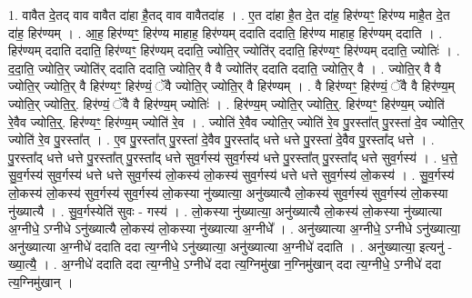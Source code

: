 \documentclass[17pt]{extarticle}
\begin{document}
1. वावैत दे॒तद् वाव वावैत दा॑हा है॒तद् वाव वावैतदा॑ह । . ए॒त दा॑हा है॒त दे॒त दा॑ह॒ हिर॑ण्यꣳ॒॒ हिर॑ण्य माहै॒त दे॒त दा॑ह॒ हिर॑ण्यम् । . आ॒ह॒ हिर॑ण्यꣳ॒॒ हिर॑ण्य माहाह॒ हिर॑ण्यम् ददाति ददाति॒ हिर॑ण्य माहाह॒ हिर॑ण्यम् ददाति । . हिर॑ण्यम् ददाति ददाति॒ हिर॑ण्यꣳ॒॒ हिर॑ण्यम् ददाति॒ ज्योति॒र् ज्योति॑र् ददाति॒ हिर॑ण्यꣳ॒॒ हिर॑ण्यम् ददाति॒ ज्योतिः॑ । . द॒दा॒ति॒ ज्योति॒र् ज्योति॑र् ददाति ददाति॒ ज्योति॒र् वै वै ज्योति॑र् ददाति ददाति॒ ज्योति॒र् वै । . ज्योति॒र् वै वै ज्योति॒र् ज्योति॒र् वै हिर॑ण्यꣳ॒॒ हिर॑ण्यं॒ ॅवै ज्योति॒र् ज्योति॒र् वै हिर॑ण्यम् । . वै हिर॑ण्यꣳ॒॒ हिर॑ण्यं॒ ॅवै वै हिर॑ण्य॒म् ज्योति॒र् ज्योति॒र्॒. हिर॑ण्यं॒ ॅवै वै हिर॑ण्य॒म् ज्योतिः॑ । . हिर॑ण्य॒म् ज्योति॒र् ज्योति॒र्॒. हिर॑ण्यꣳ॒॒ हिर॑ण्य॒म् ज्योति॑ रे॒वैव ज्योति॒र्॒. हिर॑ण्यꣳ॒॒ हिर॑ण्य॒म् ज्योति॑ रे॒व । . ज्योति॑ रे॒वैव ज्योति॒र् ज्योति॑ रे॒व पु॒रस्ता᳚त् पु॒रस्ता॑ दे॒व ज्योति॒र् ज्योति॑ रे॒व पु॒रस्ता᳚त् । . ए॒व पु॒रस्ता᳚त् पु॒रस्ता॑ दे॒वैव पु॒रस्ता᳚द् धत्ते धत्ते पु॒रस्ता॑ दे॒वैव पु॒रस्ता᳚द् धत्ते । . पु॒रस्ता᳚द् धत्ते धत्ते पु॒रस्ता᳚त् पु॒रस्ता᳚द् धत्ते सुव॒र्गस्य॑ सुव॒र्गस्य॑ धत्ते पु॒रस्ता᳚त् पु॒रस्ता᳚द् धत्ते सुव॒र्गस्य॑ । . ध॒त्ते॒ सु॒व॒र्गस्य॑ सुव॒र्गस्य॑ धत्ते धत्ते सुव॒र्गस्य॑ लो॒कस्य॑ लो॒कस्य॑ सुव॒र्गस्य॑ धत्ते धत्ते सुव॒र्गस्य॑ लो॒कस्य॑ । . सु॒व॒र्गस्य॑ लो॒कस्य॑ लो॒कस्य॑ सुव॒र्गस्य॑ सुव॒र्गस्य॑ लो॒कस्या नु॑ख्यात्या॒ अनु॑ख्यात्यै लो॒कस्य॑ सुव॒र्गस्य॑ सुव॒र्गस्य॑ लो॒कस्या नु॑ख्यात्यै । . सु॒व॒र्गस्येति॑ सुवः - गस्य॑ । . लो॒कस्या नु॑ख्यात्या॒ अनु॑ख्यात्यै लो॒कस्य॑ लो॒कस्या नु॑ख्यात्या अ॒ग्नीधे॒ ऽग्नीधे ऽनु॑ख्यात्यै लो॒कस्य॑ लो॒कस्या नु॑ख्यात्या अ॒ग्नीधे᳚ । . अनु॑ख्यात्या अ॒ग्नीधे॒ ऽग्नीधे ऽनु॑ख्यात्या॒ अनु॑ख्यात्या अ॒ग्नीधे॑ ददाति ददा त्य॒ग्नीधे ऽनु॑ख्यात्या॒ अनु॑ख्यात्या अ॒ग्नीधे॑ ददाति । . अनु॑ख्यात्या॒ इत्यनु॑ - ख्या॒त्यै॒ । . अ॒ग्नीधे॑ ददाति ददा त्य॒ग्नीधे॒ ऽग्नीधे॑ ददा त्य॒ग्निमु॑खा न॒ग्निमु॑खान् ददा त्य॒ग्नीधे॒ ऽग्नीधे॑ ददा त्य॒ग्निमु॑खान् । \newline
\end{document}
